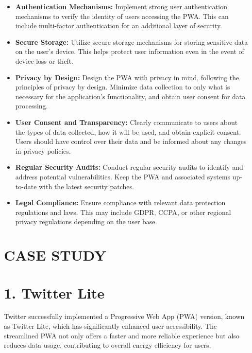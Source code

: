 \documentclass{article}
\begin{document}
\begin{multicols}{2}
\begin{itemize}
    \item \textbf{Authentication Mechanisms:} Implement strong user authentication mechanisms to verify the identity of users accessing the PWA. This can include multi-factor authentication for an additional layer of security.

    \item \textbf{Secure Storage:} Utilize secure storage mechanisms for storing sensitive data on the user's device. This helps protect user information even in the event of device loss or theft.

    \item \textbf{Privacy by Design:} Design the PWA with privacy in mind, following the principles of privacy by design. Minimize data collection to only what is necessary for the application's functionality, and obtain user consent for data processing.

    \item \textbf{User Consent and Transparency:} Clearly communicate to users about the types of data collected, how it will be used, and obtain explicit consent. Users should have control over their data and be informed about any changes in privacy policies.

    \item \textbf{Regular Security Audits:} Conduct regular security audits to identify and address potential vulnerabilities. Keep the PWA and associated systems up-to-date with the latest security patches.

    \item \textbf{Legal Compliance:} Ensure compliance with relevant data protection regulations and laws. This may include GDPR, CCPA, or other regional privacy regulations depending on the user base.
    
    \citep{Security}
\end{itemize}

\section*{CASE STUDY}

\section*{1. Twitter Lite}

Twitter successfully implemented a Progressive Web App (PWA) version, known as Twitter Lite, which has significantly enhanced user accessibility. The streamlined PWA not only offers a faster and more reliable experience but also reduces data usage, contributing to overall energy efficiency for users.
\citep*{BestPWAExamples}

\end{multicols}
\end{document}
